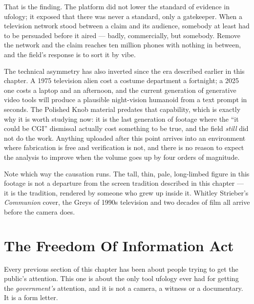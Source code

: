 That is the finding. The platform did not lower the standard of evidence in ufology; it exposed that
there was never a standard, only a gatekeeper. When a television network stood between a claim and its
audience, somebody at least had to be persuaded before it aired --- badly, commercially, but somebody.
Remove the network and the claim reaches ten million phones with nothing in between, and the
field's response is to sort it by vibe. 

The technical asymmetry has also inverted since the era described earlier in this chapter. A 1975
television alien cost a costume department a fortnight; a 2025 one costs a laptop and an afternoon,
and the current generation of generative video tools will produce a plausible night-vision humanoid
from a text prompt in seconds. The Polished Knob material predates that capability, which is exactly
why it is worth studying now: it is the last generation of footage where the ``it could be CGI''
dismissal actually cost something to be true, and the field \emph{still} did not do the work. Anything
uploaded after this point arrives into an environment where fabrication is free and verification is
not, and there is no reason to expect the analysis to improve when the volume goes up by four orders
of magnitude.

\begin{funfact}
Note which way the causation runs. The tall, thin, pale, long-limbed figure in this footage is not a
departure from the screen tradition described in this chapter --- it is the tradition, rendered by
someone who grew up inside it. Whitley Strieber's \emph{Communion} cover, the Greys of 1990s
television and two decades of film all arrive before the camera does. 
\end{funfact}

\section{The Freedom Of Information Act}\label{sec:foia}

Every previous section of this chapter has been about people trying to get the public's attention.
This one is about the only tool ufology ever had for getting the \emph{government's} attention, and
it is not a camera, a witness or a documentary. It is a form letter.

